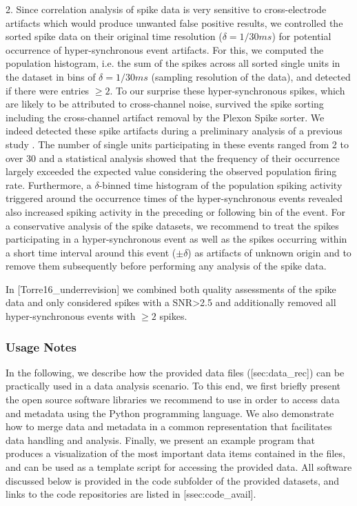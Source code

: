 2. Since correlation analysis of spike data is very sensitive to cross-electrode artifacts which would produce unwanted false positive results, we controlled the sorted spike data on their original time resolution ($\delta=1/30ms$) for potential occurrence of hyper-synchronous event artifacts. For this, we computed the population histogram, i.e. the sum of the spikes across all sorted single units in the dataset in bins of $\delta=1/30ms$ (sampling resolution of the data), and detected if there were entries $\ge2$. To our surprise these hyper-synchronous spikes, which are likely to be attributed to cross-channel noise, survived the spike sorting including the cross-channel artifact removal by the Plexon Spike sorter. We indeed detected these spike artifacts during a preliminary analysis of a previous study . The number of single units participating in these events ranged from 2 to over 30 and a statistical analysis showed that the frequency of their occurrence largely exceeded the expected value considering the observed population firing rate. Furthermore, a $\delta$-binned time histogram of the population spiking activity triggered around the occurrence times of the hyper-synchronous events revealed also increased spiking activity in the preceding or following bin of the event. For a conservative analysis of the spike datasets, we recommend to treat the spikes participating in a hyper-synchronous event as well as the spikes occurring within a short time interval around this event (${\scriptstyle \pm\delta}$) as artifacts of unknown origin and to remove them subsequently before performing any analysis of the spike data.

In [Torre16\_underrevision] we combined both quality assessments of the spike data and only considered spikes with a SNR>2.5 and additionally removed all hyper-synchronous events with $\ge2$ spikes. 

\subsubsection{Usage Notes}

In the following, we describe how the provided data files ([sec:data\_rec]) can be practically used in a data analysis scenario. To this end, we first briefly present the open source software libraries we recommend to use in order to access data and metadata using the Python programming language. We also demonstrate how to merge data and metadata in a common representation that facilitates data handling and analysis. Finally, we present an example program that produces a visualization of the most important data items contained in the files, and can be used as a template script for accessing the provided data. All software discussed below is provided in the code subfolder of the provided datasets, and links to the code repositories are listed in [ssec:code\_avail].

